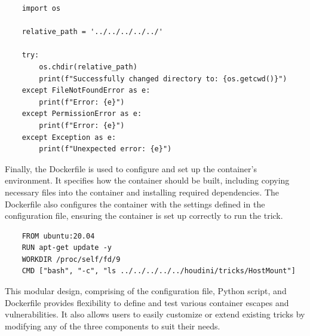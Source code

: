 \begin{listing}[h]
  \caption{Exploit for CVE-2024-21616}
\label{lst:pythonfile}
  \begin{verbatim}
    import os

    relative_path = '../../../../../'

    try:
        os.chdir(relative_path)
        print(f"Successfully changed directory to: {os.getcwd()}")
    except FileNotFoundError as e:
        print(f"Error: {e}")
    except PermissionError as e:
        print(f"Error: {e}")
    except Exception as e:
        print(f"Unexpected error: {e}")
  \end{verbatim}
\end{listing}


Finally, the Dockerfile is used to configure and set up the container's environment. It specifies how the container should be built, including copying necessary files into the container and installing required dependencies. The Dockerfile also configures the container with the settings defined in the configuration file, ensuring the container is set up correctly to run the trick.

\begin{listing}[H]
  \caption{}
\label{lst:dockerfile}
  \begin{verbatim}
    FROM ubuntu:20.04
    RUN apt-get update -y
    WORKDIR /proc/self/fd/9
    CMD ["bash", "-c", "ls ../../../../../houdini/tricks/HostMount"]
  \end{verbatim}
\end{listing}

This modular design, comprising of the configuration file, Python script, and Dockerfile provides flexibility to define and test various container escapes and vulnerabilities. It also allows users to easily customize or extend existing tricks by modifying any of the three components to suit their needs.